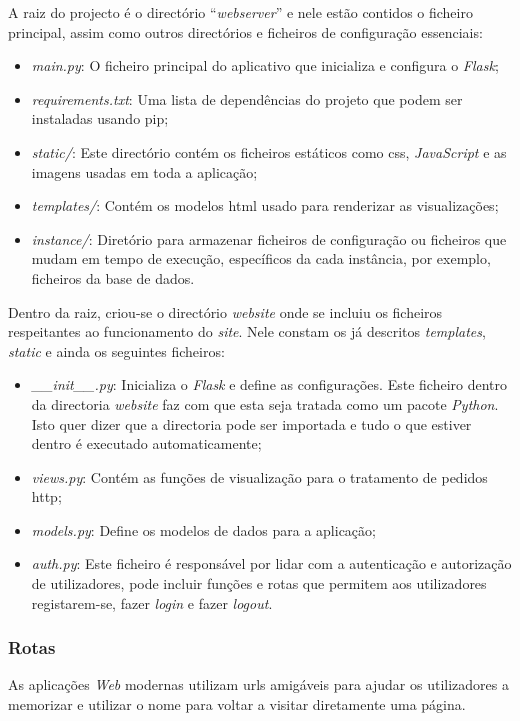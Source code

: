 A raiz do projecto é o directório ``\textit{webserver}'' e nele estão contidos o ficheiro principal, assim como outros directórios e ficheiros de configuração essenciais:
\begin{itemize}
	\item \textit{main.py}: O ficheiro principal do aplicativo que inicializa e configura o \textit{Flask};
	\item \textit{requirements.txt}: Uma lista de dependências do projeto que podem ser instaladas usando \gls{pip};
	\item \textit{static/}: Este directório contém os ficheiros estáticos como \acrshort{css}, \textit{JavaScript} e as imagens usadas em toda a aplicação;
	\item \textit{templates/}: Contém os modelos \acrshort{html} usado para renderizar as visualizações;
	\item \textit{instance/}: Diretório para armazenar ficheiros de configuração ou ficheiros que mudam em tempo de execução, específicos da cada instância, por exemplo, ficheiros da base de dados.
\end{itemize}

Dentro da raiz, criou-se o directório \textit{website} onde se incluiu os ficheiros respeitantes ao funcionamento do \textit{site}. Nele constam os já descritos \textit{templates}, \textit{static} e ainda os seguintes ficheiros:

\begin{itemize}
	\item \textit{\_\_init\_\_.py}: Inicializa o \textit{Flask} e define as configurações. Este ficheiro dentro da directoria \textit{website} faz com que esta seja tratada como um pacote \textit{Python}. Isto quer dizer que a directoria pode ser importada e tudo o que estiver dentro é executado automaticamente;
	\item \textit{views.py}: Contém as funções de visualização para o tratamento de pedidos \acrfull{http};
	\item \textit{models.py}: Define os modelos de dados para a aplicação;
	\item \textit{auth.py}: Este ficheiro é responsável por lidar com a autenticação e autorização de utilizadores, pode incluir funções e rotas que permitem aos utilizadores registarem-se, fazer \textit{login} e fazer \textit{logout}.
\end{itemize}

\subsubsection{Rotas}
As aplicações \textit{Web} modernas utilizam \acrshort{url}s amigáveis para ajudar os utilizadores a memorizar e utilizar o nome para voltar a visitar diretamente uma página.

